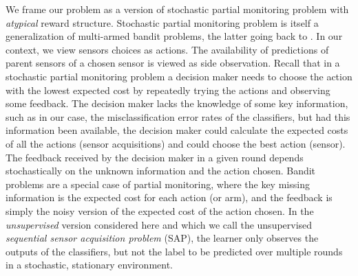 

We frame our problem as a version of stochastic partial monitoring problem \citep{BaFoPaRaSze14} with \emph{atypical} reward structure. Stochastic partial monitoring problem is itself a generalization of multi-armed bandit problems, the latter going back to \citet{Tho33}. In our context, we view sensors choices as actions. The availability of predictions of parent sensors of a chosen sensor is viewed as side observation.  Recall that in a stochastic partial monitoring problem a decision maker needs to choose the action with the lowest expected cost by repeatedly trying the actions and observing some feedback.
The decision maker lacks the knowledge of some key information, such as in our case, the misclassification
error rates of the classifiers, but had this information been available, the decision maker could calculate the
expected costs of all the actions (sensor acquisitions) and could choose the best action (sensor). The feedback received by the decision maker in a given round depends stochastically on the unknown information and the action chosen.
Bandit problems are a special case of partial monitoring, where the key missing information is the expected
cost for each action (or arm), and the feedback is simply the noisy version of the expected cost of the action chosen.
In the \emph{unsupervised} version considered here
and which we call the unsupervised \emph{sequential sensor acquisition problem} (SAP),
the learner only observes the outputs of the classifiers, but not the label to be predicted over multiple rounds
in a stochastic, stationary environment. 




